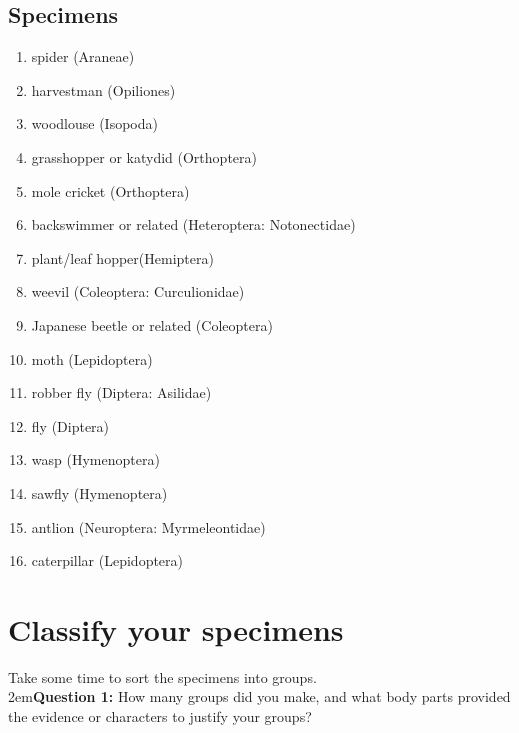 \documentclass[letterpaper, 11pt]{article}
\begin{document}
\subsection*{Specimens}

\begin{enumerate}
	\item {spider (Araneae)}
	\item {harvestman (Opiliones)}
	\item {woodlouse (Isopoda)}
	\item {grasshopper or katydid (Orthoptera)}
    \item mole cricket (Orthoptera)
	\item {backswimmer or related (Heteroptera: Notonectidae)}
	\item {plant/leaf hopper(Hemiptera)}
	\item {weevil (Coleoptera: Curculionidae)}
    \item Japanese beetle or related (Coleoptera)
	\item {moth (Lepidoptera)}
	\item {robber fly (Diptera: Asilidae)}
	\item {fly (Diptera)}
	\item {wasp (Hymenoptera)}
	\item {sawfly (Hymenoptera)}
	\item {antlion (Neuroptera: Myrmeleontidae)}
    \item caterpillar (Lepidoptera)
\end{enumerate}

\section{Classify your specimens} %
Take some time to sort the specimens into groups. \\

\hangindent2em{}\textbf{Question 1:} How many groups did you make, and what body parts provided the evidence or characters to justify your groups?
\end{document}
